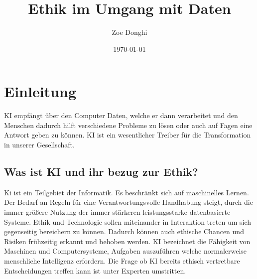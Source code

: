 \documentclass{report}
\title{Ethik im Umgang mit Daten}
\author{Zoe Donghi}
\date{\today}
\begin{document}
\maketitle


\tableofcontents

\chapter{Einleitung}

KI empfängt über den Computer Daten, welche er dann verarbeitet und den Menschen dadurch hilft verschiedene Probleme zu lösen oder auch auf Fagen eine Antwort geben zu können.
KI ist ein wesentlicher Treiber für die Transformation in unserer Gesellschaft.

\section{Was ist KI und ihr bezug zur Ethik?}
Ki ist ein Teilgebiet der Informatik. Es beschränkt sich auf maschinelles Lernen.
Der Bedarf an Regeln für eine Verantwortungsvolle Handhabung steigt, durch die immer größere Nutzung der immer stärkeren leistungsstarke datenbasierte Systeme. 
Ethik und Technologie sollen miteinander in Interaktion treten um sich gegenseitig bereichern zu können. Dadurch können auch ethische Chancen und Risiken frühzeitig erkannt und behoben werden. 
KI bezeichnet die Fähigkeit von Maschinen und Computersysteme, Aufgaben auszuführen welche normalerweise menschliche Intelligenz erfordern. 
Die Frage ob KI bereits ethisch vertretbare Entscheidungen treffen kann ist unter Experten umstritten. 
\end{document}
